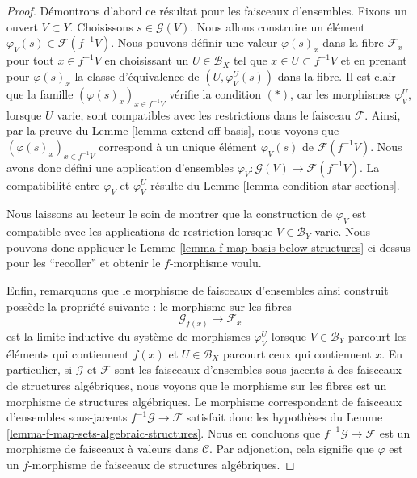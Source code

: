 \begin{proof}
Démontrons d'abord ce résultat pour les faisceaux d'ensembles.
Fixons un ouvert $V \subset Y$. Choisissons $s \in \mathcal{G}(V)$.
Nous allons construire un élément
$\varphi_V(s) \in \mathcal{F}(f^{-1}V)$.
Nous pouvons définir une valeur $\varphi(s)_x$ dans la fibre $\mathcal{F}_x$
pour tout $x \in f^{-1}V$ en choisissant un $U \in \mathcal{B}_X$
tel que $x \in U \subset f^{-1}V$ et en prenant pour $\varphi(s)_x$
la classe d'équivalence de $(U, \varphi_V^U(s))$
dans la fibre. Il est clair que la famille $(\varphi(s)_x)_{x \in f^{-1}V}$
vérifie la condition $(*)$, car les morphismes $\varphi_V^U$,
lorsque $U$ varie,
sont compatibles avec les restrictions dans le faisceau $\mathcal{F}$.
Ainsi, par la preuve du Lemme \ref{lemma-extend-off-basis},
nous voyons que $(\varphi(s)_x)_{x \in f^{-1}V}$ correspond
à un unique élément $\varphi_V(s)$ de $\mathcal{F}(f^{-1}V)$.
Nous avons donc défini une application d'ensembles
$\varphi_V : \mathcal{G}(V) \to \mathcal{F}(f^{-1}V)$.
La compatibilité entre $\varphi_V$ et $\varphi_V^U$
résulte du Lemme \ref{lemma-condition-star-sections}.

\medskip\noindent
Nous laissons au lecteur le soin de montrer que la construction
de $\varphi_V$ est compatible avec les applications de restriction lorsque
$V \in \mathcal{B}_Y$ varie. Nous pouvons donc appliquer le Lemme
\ref{lemma-f-map-basis-below-structures} ci-dessus pour les
``recoller'' et obtenir le $f$-morphisme voulu.

\medskip\noindent
Enfin, remarquons que le morphisme de faisceaux d'ensembles ainsi construit
possède la propriété suivante : le morphisme sur les fibres
$$
\mathcal{G}_{f(x)} \longrightarrow \mathcal{F}_x
$$
est la limite inductive du système de morphismes $\varphi_V^U$ lorsque
$V \in \mathcal{B}_Y$ parcourt les éléments qui
contiennent $f(x)$ et $U \in \mathcal{B}_X$ parcourt ceux qui
contiennent $x$. En particulier, si $\mathcal{G}$ et $\mathcal{F}$
sont les faisceaux d'ensembles sous-jacents à des faisceaux de structures algébriques,
nous voyons que le morphisme sur les fibres est un morphisme de structures
algébriques. Le morphisme correspondant de
faisceaux d'ensembles sous-jacents $f^{-1}\mathcal{G} \to \mathcal{F}$
satisfait donc les hypothèses du
Lemme \ref{lemma-f-map-sets-algebraic-structures}.
Nous en concluons que $f^{-1}\mathcal{G} \to \mathcal{F}$
est un morphisme de faisceaux à valeurs dans $\mathcal{C}$.
Par adjonction, cela signifie que $\varphi$ est
un $f$-morphisme de faisceaux de structures algébriques.
\end{proof}

